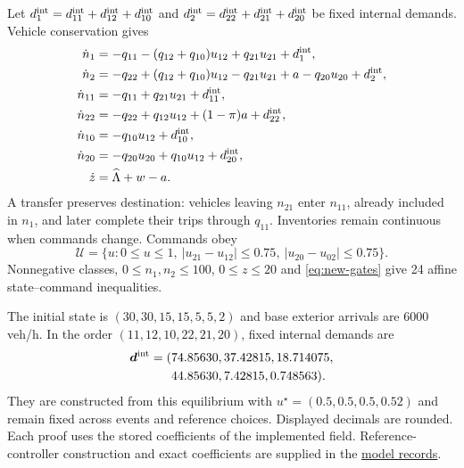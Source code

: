 \documentclass[preprint,12pt]{elsarticle}
\newcommand{\reproductiondetails}[1]{\href{https://github.com/AlienEslami/agentic-perimeter-runtime-certification/blob/main/paper/supporting_materials/REPRODUCING_THE_REDUCED_PAPER.md}{#1}}
\begin{document}
Let $d^{\rm int}_1=d^{\rm int}_{11}+d^{\rm int}_{12}+d^{\rm int}_{10}$ and $d^{\rm int}_2=d^{\rm int}_{22}+d^{\rm int}_{21}+d^{\rm int}_{20}$ be fixed
internal demands. Vehicle conservation gives
\begin{equation}
\begin{aligned}
\dot n_1&=-q_{11}-(q_{12}+q_{10})u_{12}+q_{21}u_{21}+d^{\rm int}_1,\\
\dot n_2&=-q_{22}+(q_{12}+q_{10})u_{12}-q_{21}u_{21}
                 +a-q_{20}u_{20}+d^{\rm int}_2,\\
\dot n_{11}&=-q_{11}+q_{21}u_{21}+d^{\rm int}_{11},\\
\dot n_{22}&=-q_{22}+q_{12}u_{12}+(1-\pi)a+d^{\rm int}_{22},\\
\dot n_{10}&=-q_{10}u_{12}+d^{\rm int}_{10},\\
\dot n_{20}&=-q_{20}u_{20}+q_{10}u_{12}+d^{\rm int}_{20},\\
\dot z&=\widehat\Lambda+w-a.
\end{aligned}
\label{eq:new-plant}
\end{equation}
A transfer preserves destination: vehicles leaving $n_{21}$ enter
$n_{11}$, already included in $n_1$, and later complete their trips through
$q_{11}$. Inventories remain continuous when commands change. Commands obey
\begin{equation}
\mathcal U=\{u:0\le u\le1,\ |u_{21}-u_{12}|\le0.75,
\ |u_{20}-u_{02}|\le0.75\}.
\label{eq:new-gates}
\end{equation}
Nonnegative classes, $0\le n_1,n_2\le100$, $0\le z\le20$ and
\eqref{eq:new-gates} give 24 affine state--command inequalities.

The initial state is $(30,30,15,15,5,5,2)$ and base exterior arrivals are
6000 veh/h. In the order $(11,12,10,22,21,20)$, fixed internal demands are
\begin{equation}
\begin{aligned}
\boldsymbol d^{\rm int}=(&74.85630,37.42815,18.714075,\\
              &44.85630,7.42815,0.748563).
\end{aligned}
\label{eq:new-incident-demands}
\end{equation}
They are constructed from this equilibrium with
$u^\star=(0.5,0.5,0.5,0.52)$ and remain fixed across events and reference
choices. Displayed decimals are rounded. Each proof uses the stored
coefficients of the implemented field. Reference-controller construction
and exact coefficients are supplied in the \reproductiondetails{model records}.
\end{document}

